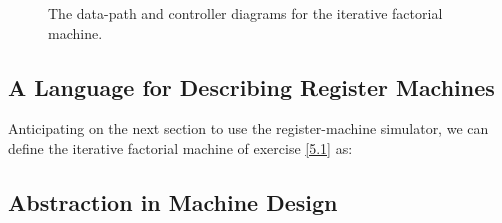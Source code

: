\begin{exe}[5.1]
\begin{figure}
        \caption{The data-path and controller diagrams for the iterative 
        factorial machine.}
        \label{5.1fig}
    \end{figure}
\end{exe}

\subsection{A Language for Describing Register Machines}

\begin{exe}[5.2]
    Anticipating on the next section to use the register-machine simulator, we 
    can define the iterative factorial machine of exercise \ref{5.1} as:
\end{exe}

\subsection{Abstraction in Machine Design}

